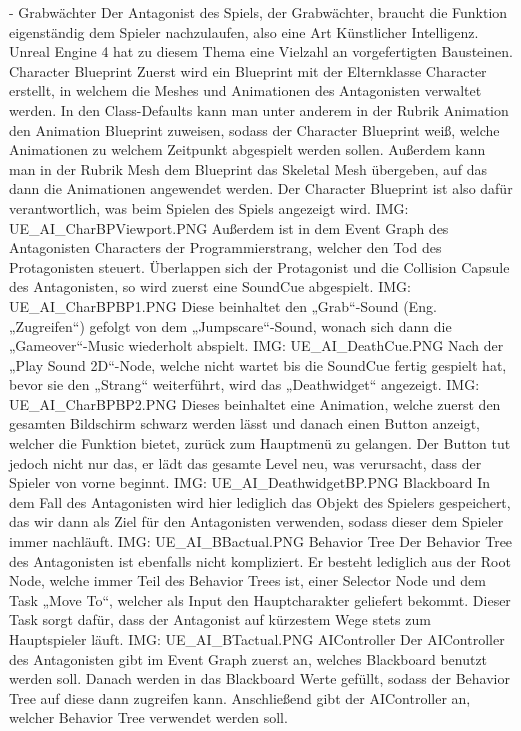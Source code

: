 -	Grabwächter
Der Antagonist des Spiels, der Grabwächter, braucht die Funktion eigenständig dem Spieler nachzulaufen, also eine Art Künstlicher Intelligenz. Unreal Engine 4 hat zu diesem Thema eine Vielzahl an vorgefertigten Bausteinen.
Character Blueprint
Zuerst wird ein Blueprint mit der Elternklasse Character erstellt, in welchem die Meshes und Animationen des Antagonisten verwaltet werden. In den Class-Defaults kann man unter anderem in der Rubrik Animation den Animation Blueprint zuweisen, sodass der Character Blueprint weiß, welche Animationen zu welchem Zeitpunkt abgespielt werden sollen. Außerdem kann man in der Rubrik Mesh dem Blueprint das Skeletal Mesh übergeben, auf das dann die Animationen angewendet werden. Der Character Blueprint ist also dafür verantwortlich, was beim Spielen des Spiels angezeigt wird.
{IMG: UE_AI_CharBPViewport.PNG}
Außerdem ist in dem Event Graph des Antagonisten Characters der Programmierstrang, welcher den Tod des Protagonisten steuert. Überlappen sich der Protagonist und die Collision Capsule des Antagonisten, so wird zuerst eine SoundCue abgespielt.
{IMG: UE_AI_CharBPBP1.PNG}
Diese beinhaltet den „Grab“-Sound (Eng. „Zugreifen“) gefolgt von dem „Jumpscare“-Sound, wonach sich dann die „Gameover“-Music wiederholt abspielt.
{IMG: UE_AI_DeathCue.PNG}
Nach der „Play Sound 2D“-Node, welche nicht wartet bis die SoundCue fertig gespielt hat, bevor sie den „Strang“ weiterführt, wird das „Deathwidget“ angezeigt.
{IMG: UE_AI_CharBPBP2.PNG}
Dieses beinhaltet eine Animation, welche zuerst den gesamten Bildschirm schwarz werden lässt und danach einen Button anzeigt, welcher die Funktion bietet, zurück zum Hauptmenü zu gelangen. Der Button tut jedoch nicht nur das, er lädt das gesamte Level neu, was verursacht, dass der Spieler von vorne beginnt.
{IMG: UE_AI_DeathwidgetBP.PNG}
Blackboard
In dem Fall des Antagonisten wird hier lediglich das Objekt des Spielers gespeichert, das wir dann als Ziel für den Antagonisten verwenden, sodass dieser dem Spieler immer nachläuft.
{IMG: UE_AI_BBactual.PNG}
Behavior Tree
Der Behavior Tree des Antagonisten ist ebenfalls nicht kompliziert. Er besteht lediglich aus der Root Node, welche immer Teil des Behavior Trees ist, einer Selector Node und dem Task „Move To“, welcher als Input den Hauptcharakter geliefert bekommt. Dieser Task sorgt dafür, dass der Antagonist auf kürzestem Wege stets zum Hauptspieler läuft.
{IMG: UE_AI_BTactual.PNG}
AIController
Der AIController des Antagonisten gibt im Event Graph zuerst an, welches Blackboard benutzt werden soll. Danach werden in das Blackboard Werte gefüllt, sodass der Behavior Tree auf diese dann zugreifen kann. Anschließend gibt der AIController an, welcher Behavior Tree verwendet werden soll.
